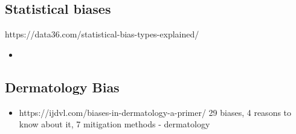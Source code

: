 \documentclass[12pt, a4paper, oneside]{book}   	%
\begin{document}
		\subsection{Statistical biases}
			https://data36.com/statistical-bias-types-explained/
			\begin{itemize}
				\item 
			\end{itemize}	
	
		\subsection{Dermatology Bias}
			\begin{itemize}
				\item https://ijdvl.com/biases-in-dermatology-a-primer/ 29 biases, 4 reasons to know about it, 7 mitigation methods \autocite{Chakraborty_2024} - dermatology
				

\end{itemize}
\end{document}
